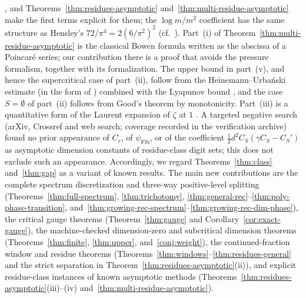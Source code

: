 \documentclass[11pt]{article}
\theoremstyle{definition}
\theoremstyle{remark}
\begin{document}
\cite{DFSU}, and Theorems~\ref{thm:residues-asymptotic}
and~\ref{thm:multi-residue-asymptotic} make the first terms explicit for them;
the $\log m/m^2$ coefficient has the same structure as Hensley's
$72/\pi^4=2(6/\pi^2)^2$ (cf.\ \cite[(1.4)]{DFSU}). Part~(i) of
Theorem~\ref{thm:multi-residue-asymptotic} is the classical Bowen formula
written as the abscissa of a Poincar\'e series; our contribution there is a
proof that avoids the pressure formalism, together with its formalization.
The upper bound in part~(v), and hence the supercritical case of part~(ii),
follow from the Heinemann--Urba\'nski estimate \cite{HU02} (in the form of
\cite[Theorem~2.4]{CLU}) combined with the Lyapunov bound
\cite[Proposition~2.6]{CLU}, and the case $S=\emptyset$ of part~(ii) follows
from Good's theorem by monotonicity. Part~(iii) is a quantitative form of the
Laurent expansion of $\zeta$ at $1$ \cite[(25.2.4)]{DLMF}. A targeted negative
search (arXiv, Crossref and web search; coverage recorded in the verification
archive) found no prior appearance of $C_r$, of $\psi_{\mathrm{Fib}}$, or of the
coefficient $\frac12 d^2C_S(\gamma C_S-C_S')$ as asymptotic dimension constants
of residue-class digit sets; this does not exclude such an appearance.
Accordingly, we
regard Theorems~\ref{thm:class} and~\ref{thm:gap} as a variant of known results.
The main new contributions are the complete spectrum discretization and
three-way positive-level splitting (Theorems~\ref{thm:full-spectrum},
\ref{thm:trichotomy}, \ref{thm:general-rec}--\ref{thm:poly-phase-transition},
and~\ref{thm:growing-rec-spectrum}--\ref{thm:growing-rec-dim-phase}), the critical gauge theorems
(Theorem~\ref{thm:gauge} and Corollary~\ref{cor:exact-gauge}), the machine-checked
dimension-zero and subcritical dimension theorems (Theorems~\ref{thm:finite},
\ref{thm:upper}, and~\ref{conj:weight}), the continued-fraction window and
residue theorems (Theorems~\ref{thm:windows}--\ref{thm:residues-general} and the
strict separation in Theorem~\ref{thm:residues-asymptotic}(ii)), and explicit
residue-class instances of known asymptotic methods
(Theorems~\ref{thm:residues-asymptotic}(iii)--(iv)
and~\ref{thm:multi-residue-asymptotic}).
\end{document}

